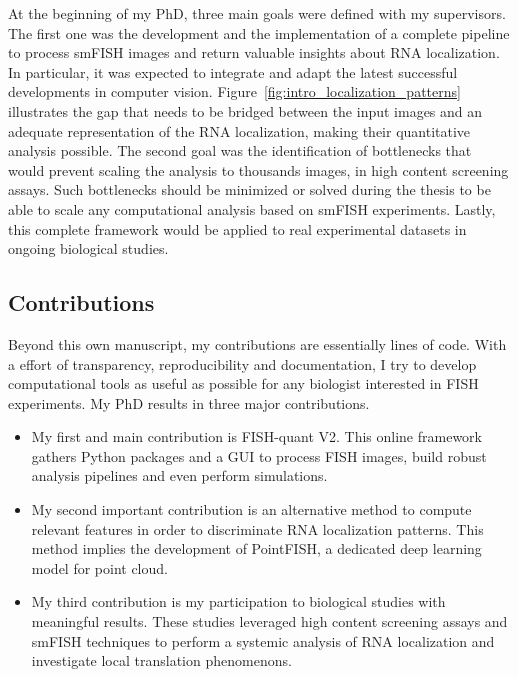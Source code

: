 At the beginning of my PhD, three main goals were defined with my supervisors.
The first one was the development and the implementation of a complete pipeline to process \ac{smFISH} images and return valuable insights about \ac{RNA} localization.
In particular, it was expected to integrate and adapt the latest successful developments in computer vision.
Figure~\ref{fig:intro_localization_patterns} illustrates the gap that needs to be bridged between the input images and an adequate representation of the \ac{RNA} localization, making their quantitative analysis possible.
The second goal was the identification of bottlenecks that would prevent scaling the analysis to thousands images, in high content screening assays.
Such bottlenecks should be minimized or solved during the thesis to be able to scale any computational analysis based on \ac{smFISH} experiments.
Lastly, this complete framework would be applied to real experimental datasets in ongoing biological studies.

\subsection{Contributions}
\label{subsec:intro_contributions}

Beyond this own manuscript, my contributions are essentially lines of code.
With a effort of transparency, reproducibility and documentation, I try to develop computational tools as useful as possible for any biologist interested in \ac{FISH} experiments.
My PhD results in three major contributions.

\begin{itemize}
	\setlength\itemsep{0.1em}
	\item My first and main contribution is FISH-quant V2.
	This online framework gathers Python packages and a \ac{GUI} to process \ac{FISH} images, build robust analysis pipelines and even perform simulations.
	\item My second important contribution is an alternative method to compute relevant features in order to discriminate \ac{RNA} localization patterns.
	This method implies the development of PointFISH, a dedicated deep learning model for point cloud.
	\item My third contribution is my participation to biological studies with meaningful results.
	These studies leveraged high content screening assays and \ac{smFISH} techniques to perform a systemic analysis of \ac{RNA} localization and investigate local translation phenomenons.
\end{itemize}

